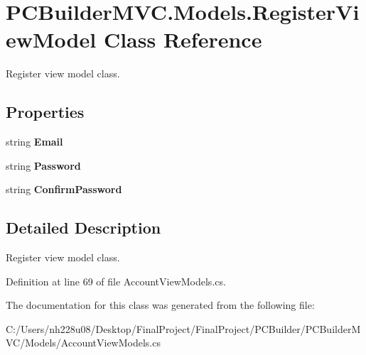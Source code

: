 \hypertarget{class_p_c_builder_m_v_c_1_1_models_1_1_register_view_model}{}\section{P\+C\+Builder\+M\+V\+C.\+Models.\+Register\+View\+Model Class Reference}
\label{class_p_c_builder_m_v_c_1_1_models_1_1_register_view_model}


Register view model class.  


\subsection*{Properties}
\begin{DoxyCompactItemize}
\item 
string {\bfseries Email}\hypertarget{class_p_c_builder_m_v_c_1_1_models_1_1_register_view_model_af8ae2184f403e620de3d21ae932d1b0e}{}\label{class_p_c_builder_m_v_c_1_1_models_1_1_register_view_model_af8ae2184f403e620de3d21ae932d1b0e}

\item 
string {\bfseries Password}\hypertarget{class_p_c_builder_m_v_c_1_1_models_1_1_register_view_model_a589ad6550bb3e870c0133b5065ea785a}{}\label{class_p_c_builder_m_v_c_1_1_models_1_1_register_view_model_a589ad6550bb3e870c0133b5065ea785a}

\item 
string {\bfseries Confirm\+Password}\hypertarget{class_p_c_builder_m_v_c_1_1_models_1_1_register_view_model_aac262891062b5be4831f40a4baf06f48}{}\label{class_p_c_builder_m_v_c_1_1_models_1_1_register_view_model_aac262891062b5be4831f40a4baf06f48}

\end{DoxyCompactItemize}


\subsection{Detailed Description}
Register view model class. 



Definition at line 69 of file Account\+View\+Models.\+cs.



The documentation for this class was generated from the following file\+:\begin{DoxyCompactItemize}
\item 
C\+:/\+Users/nh228u08/\+Desktop/\+Final\+Project/\+Final\+Project/\+P\+C\+Builder/\+P\+C\+Builder\+M\+V\+C/\+Models/Account\+View\+Models.\+cs\end{DoxyCompactItemize}
